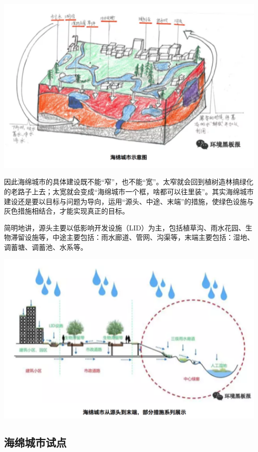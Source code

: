 \documentclass[]{book}
\begin{document}
\includegraphics[width=6.67in]{images/ch3}

因此海绵城市的具体建设既不能``窄''，也不能``宽''。太窄就会回到植树造林搞绿化的老路子上去；太宽就会变成``海绵城市一个框，啥都可以往里装''。其实海绵城市建设还是要以目标与问题为导向，运用``源头、中途、末端''的措施，使绿色设施与灰色措施相结合，才能实现真正的目标。

简明地讲，源头主要以低影响开发设施（LID）为主，包括植草沟、雨水花园、生物滞留设施等，中途主要包括：雨水廊道、管网、沟渠等，末端主要包括：湿地、调蓄塘、调蓄池、水系等。

\includegraphics[width=6.67in]{images/ch4}

\hypertarget{ux6d77ux7ef5ux57ceux5e02ux8bd5ux70b9}{%
\subsection{海绵城市试点}\label{ux6d77ux7ef5ux57ceux5e02ux8bd5ux70b9}}
\end{document}
